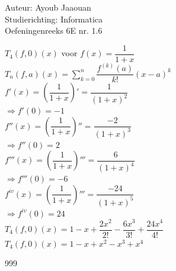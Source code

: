 \documentclass[a4paper]{article}
\begin{document}
\noindent \large Auteur: Ayoub Jaaouan \\
\noindent \large Studierichting: Informatica\\
\noindent \large Oefeningenreeks 6E nr. 1.6\\
\medskip

\normalsize



$T_4(f,0)(x)$ voor $f(x) = \dfrac{1}{1+x}$ \\

$T_n(f,a)(x) = \displaystyle\sum_{k = 0}^{n} \dfrac{f^{(k)}(a)}{k!}(x - a)^k$ \\


$f'(x)=\left(\dfrac{1}{1+x}\right)' = \dfrac{1}{(1+x)^2}$ \\

$\Rightarrow f'(0)=-1$\\

$f''(x)=\left(\dfrac{1}{1+x}\right)'' = \dfrac{-2}{(1+x)^3}$ \\

$\Rightarrow f''(0)=2$\\

$f'''(x)=\left(\dfrac{1}{1+x}\right)''' = \dfrac{6}{(1+x)^4}$\\

$\Rightarrow f'''(0)=-6$\\

$f^{iv}(x)=\left(\dfrac{1}{1+x}\right)''' = \dfrac{-24}{(1+x)^5}$\\

$\Rightarrow f^{iv}(0)=24$\\


$T_4(f,0)(x) = 1 -x + \dfrac{2x^2}{2!} - \dfrac{6x^3}{3!} + 
\dfrac{24x^4}{4!}$ \\

$T_4(f,0)(x) = 1 -x + x^2 - x^3 + x^4$ \\


	


\begin{thebibliography}{999}
\end{thebibliography}
\end{document}
